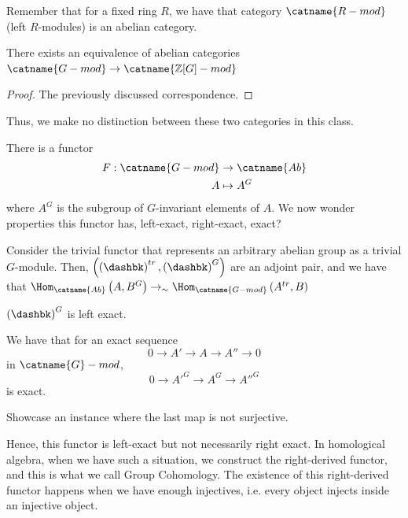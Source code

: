 \documentclass[12pt]{scrartcl}
\begin{document}
Remember that for a fixed ring $R$, we have that category $\catname{R-mod}$ (left $R$-modules) is an abelian category. 
\begin{proposition}
	There exists an equivalence of abelian categories $\catname{G-mod} \to \catname{\mathbb{Z}[G]-mod}$ 
\end{proposition}
\begin{proof}
The previously discussed correspondence.
\end{proof}

Thus, we make no distinction between these two categories in this class.

There is a functor 
\begin{align*}
	F: \catname{G-mod} &\to \catname{Ab} \\
	A  &\mapsto A^G
\end{align*}
where $A^G$ is the subgroup of $G$-invariant elements of $A$.
We now wonder properties this functor has, left-exact, right-exact, exact?

\begin{fact}
Consider the trivial functor that represents an arbitrary abelian group as a trivial $G$-module.
Then, $\left( \left(\dashbk\right)^{tr}, \left(\dashbk\right)^{G}\right)$ are an adjoint pair, and we have that
$\Hom_{\catname{Ab}}\left(A, B^G\right) \to_{\sim} \Hom_{\catname{G-mod}} \left(A^{tr}, B\right)$ 
\end{fact}

\begin{corollary}
 $\left(\dashbk\right)^G$ is left exact. 
\end{corollary}

We have that for an exact sequence
\[
0 \to A' \to A \to A'' \to 0
\] 
in $\catname{G}-mod$,
\[
0 \to A'^G \to A^G \to A''^G 
\] 
is exact.

\begin{exercise}
Showcase an instance where the last map is not surjective.
\end{exercise}
Hence, this functor is left-exact but not necessarily right exact.
In homological algebra, when we have such a situation, we construct the right-derived functor, and this is what we call Group Cohomology.
The existence of this right-derived functor happens when we have enough injectives, i.e. every object injects inside an injective object.
\end{document}
